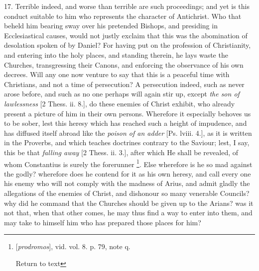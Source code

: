 17. Terrible indeed, and worse than terrible are
such proceedings; and yet is this conduct suitable to him who
represents the character of Antichrist. Who that beheld him bearing
sway over his pretended Bishops, and presiding in Ecclesiastical
causes, would not justly exclaim that this was the abomination of
desolation spoken of by Daniel? For having put on the profession of
Christianity, and entering into the holy places, and standing therein,
he lays waste the Churches, transgressing their Canons, and enforcing
the observance of his own decrees. Will any one now venture to say
that this is a peaceful time with Christians, and not a time of
persecution? A persecution indeed, such as never arose before, and
such as no one perhaps will again stir up, except \emph{the son of
lawlessness} [2 Thess. ii. 8.], do these enemies of Christ exhibit,
who already present a picture of him in their own persons. Wherefore
it especially behoves us to be sober, lest this heresy which has
reached such a height of impudence, and has diffused itself abroad
like the \emph{poison of an adder} [Ps. lviii. 4.], as it is written
in the Proverbs, and which teaches doctrines contrary to the Saviour;
lest, I say, this be that \emph{falling away} [2 Thess. ii. 3.], after
which He shall be revealed, of whom Constantius is surely the
forerunner \footnote{[\emph{prodromos}], vid. vol. 8. p. 79, note
q.

Return to text}. Else wherefore is he so mad against the godly?
wherefore does he contend for it as his own heresy, and call every one
his enemy who will not comply with the madness of Arius, and admit
gladly the allegations of the enemies of Christ, and dishonour so many
venerable Councils? why did he command that the Churches should be
given up to the Arians? was it not that, when that other comes, he may
thus find a way to enter into them, and may take to himself him who
has prepared those places for him?

